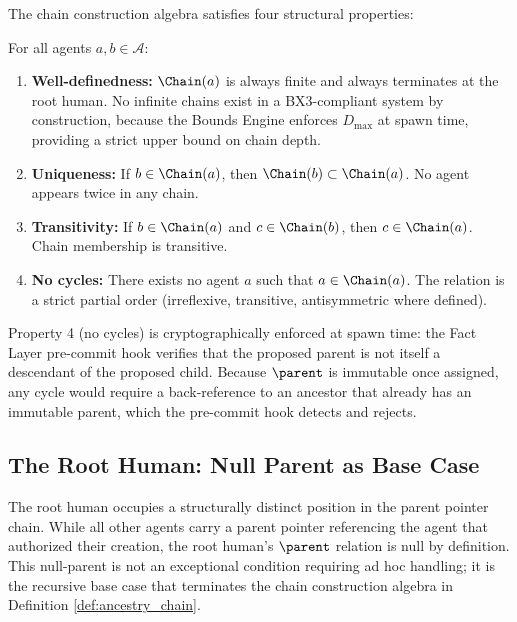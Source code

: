 The chain construction algebra satisfies four structural properties:

\begin{property}
\label{prop:chain_algebra_properties}
For all agents $a, b \in \mathcal{A}$:
\begin{enumerate}
    \item \textbf{Well-definedness:} $\Chain(a)$ is always finite and always terminates at the root human. No infinite chains exist in a BX3-compliant system by construction, because the Bounds Engine enforces $D_{\max}$ at spawn time, providing a strict upper bound on chain depth.
    \item \textbf{Uniqueness:} If $b \in \Chain(a)$, then $\Chain(b) \subset \Chain(a)$. No agent appears twice in any chain.
    \item \textbf{Transitivity:} If $b \in \Chain(a)$ and $c \in \Chain(b)$, then $c \in \Chain(a)$. Chain membership is transitive.
    \item \textbf{No cycles:} There exists no agent $a$ such that $a \in \Chain(a)$. The \ParentPointer{} relation is a strict partial order (irreflexive, transitive, antisymmetric where defined).
\end{enumerate}
\end{property}

Property 4 (no cycles) is cryptographically enforced at spawn time: the Fact Layer pre-commit hook verifies that the proposed parent is not itself a descendant of the proposed child. Because $\parent$ is immutable once assigned, any cycle would require a back-reference to an ancestor that already has an immutable parent, which the pre-commit hook detects and rejects.

\subsection{The Root Human: Null Parent as Base Case}
\label{sec:root_human_base_case}

The root human occupies a structurally distinct position in the parent pointer chain. While all other agents carry a parent pointer referencing the agent that authorized their creation, the root human's $\parent$ relation is null by definition. This null-parent is not an exceptional condition requiring ad hoc handling; it is the recursive base case that terminates the chain construction algebra in Definition \ref{def:ancestry_chain}.

